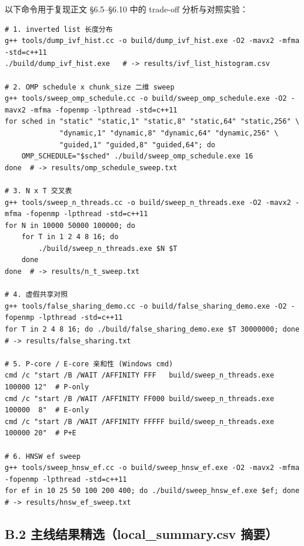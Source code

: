 \documentclass[a4paper,11pt,UTF8]{ctexart}
\begin{document}
以下命令用于复现正文 §6.5--§6.10 中的 trade-off 分析与对照实验：
\begin{lstlisting}[language={},frame=single]
# 1. inverted list 长度分布
g++ tools/dump_ivf_hist.cc -o build/dump_ivf_hist.exe -O2 -mavx2 -mfma -std=c++11
./build/dump_ivf_hist.exe   # -> results/ivf_list_histogram.csv

# 2. OMP schedule x chunk_size 二维 sweep
g++ tools/sweep_omp_schedule.cc -o build/sweep_omp_schedule.exe -O2 -mavx2 -mfma -fopenmp -lpthread -std=c++11
for sched in "static" "static,1" "static,8" "static,64" "static,256" \
             "dynamic,1" "dynamic,8" "dynamic,64" "dynamic,256" \
             "guided,1" "guided,8" "guided,64"; do
    OMP_SCHEDULE="$sched" ./build/sweep_omp_schedule.exe 16
done  # -> results/omp_schedule_sweep.txt

# 3. N x T 交叉表
g++ tools/sweep_n_threads.cc -o build/sweep_n_threads.exe -O2 -mavx2 -mfma -fopenmp -lpthread -std=c++11
for N in 10000 50000 100000; do
    for T in 1 2 4 8 16; do
        ./build/sweep_n_threads.exe $N $T
    done
done  # -> results/n_t_sweep.txt

# 4. 虚假共享对照
g++ tools/false_sharing_demo.cc -o build/false_sharing_demo.exe -O2 -fopenmp -lpthread -std=c++11
for T in 2 4 8 16; do ./build/false_sharing_demo.exe $T 30000000; done  # -> results/false_sharing.txt

# 5. P-core / E-core 亲和性 (Windows cmd)
cmd /c "start /B /WAIT /AFFINITY FFF   build/sweep_n_threads.exe 100000 12"  # P-only
cmd /c "start /B /WAIT /AFFINITY FF000 build/sweep_n_threads.exe 100000  8"  # E-only
cmd /c "start /B /WAIT /AFFINITY FFFFF build/sweep_n_threads.exe 100000 20"  # P+E

# 6. HNSW ef sweep
g++ tools/sweep_hnsw_ef.cc -o build/sweep_hnsw_ef.exe -O2 -mavx2 -mfma -fopenmp -lpthread -std=c++11
for ef in 10 25 50 100 200 400; do ./build/sweep_hnsw_ef.exe $ef; done  # -> results/hnsw_ef_sweep.txt
\end{lstlisting}

\subsection*{B.2 主线结果精选（local\_summary.csv 摘要）}
\end{document}
